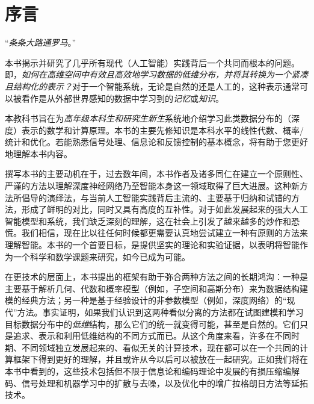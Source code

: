 \documentclass[../../book-main.tex]{subfiles}
\begin{document}
\chapter*{序言}

\begin{center}
``{\em 条条大路通罗马}。''

\end{center}
\vspace{5mm}

本书揭示并研究了几乎所有现代（人工智能）实践背后一个共同而根本的问题。即，{\em 如何在高维空间中有效且高效地学习数据的低维分布，并将其转换为一个紧凑且结构化的表示？}对于一个智能系统，无论是自然的还是人工的，这种表示通常可以被看作是从外部世界感知的数据中学习到的{\em 记忆}或{\em 知识}。

本教科书旨在为{\em 高年级本科生和研究生新生}系统地介绍学习此类数据分布的（深度）表示的数学和计算原理。本书的主要先修知识是本科水平的线性代数、概率/统计和优化。若能熟悉信号处理、信息论和反馈控制的基本概念，将有助于您更好地理解本书内容。

撰写本书的主要动机在于，过去数年间，本书作者及诸多同仁在建立一个原则性、严谨的方法以理解深度神经网络乃至智能本身这一领域取得了巨大进展。这种新方法所倡导的演绎法，与当前人工智能实践背后主流的、主要基于归纳和试错的方法，形成了鲜明的对比，同时又具有高度的互补性。对于如此发展起来的强大人工智能模型和系统，我们缺乏深刻的理解，这在社会上引发了越来越多的炒作和恐慌。我们相信，现在比以往任何时候都更需要认真地尝试建立一种有原则的方法来理解智能。本书的一个首要目标，是提供坚实的理论和实验证据，以表明将智能作为一个科学和数学课题来研究，如今已成为可能。

在更技术的层面上，本书提出的框架有助于弥合两种方法之间的长期鸿沟：一种是主要基于解析几何、代数和概率模型（例如，子空间和高斯分布）来为数据结构建模的经典方法；另一种是基于经验设计的非参数模型（例如，深度网络）的“现代”方法。事实证明，如果我们认识到这两种看似分离的方法都在试图建模和学习目标数据分布中的{\em 低维}结构，那么它们的统一就变得可能，甚至是自然的。它们只是追求、表示和利用低维结构的不同方式而已。从这个角度来看，许多在不同时期、不同领域独立发展起来的、看似无关的计算技术，现在都可以在一个共同的计算框架下得到更好的理解，并且或许从今以后可以被放在一起研究。正如我们将在本书中看到的，这些技术包括但不限于信息论和编码理论中发展的有损压缩编解码、信号处理和机器学习中的扩散与去噪，以及优化中的增广拉格朗日方法等延拓技术。
\end{document}
